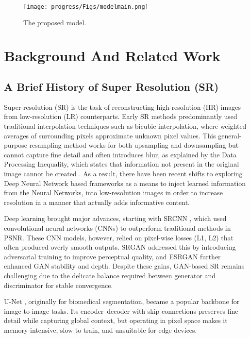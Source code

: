 \documentclass{article} %
\begin{document}
\begin{figure}[h!]
\begin{center}
\texttt{[image: progress/Figs/modelmain.png]}
\end{center}
\caption{The proposed model.}
\label{modelmain}
\end{figure}

\section{Background And Related Work}

\subsection{A Brief History of Super Resolution (SR)}

Super-resolution (SR) is the task of reconstructing high-resolution (HR) images from low-resolution (LR) counterparts. Early SR methods predominantly used traditional interpolation techniques such as bicubic interpolation, where weighted averages of surrounding pixels approximate unknown pixel values. This general-purpose resampling method works for both upsampling and downsampling but cannot capture fine detail and often introduces blur, as explained by the Data Processing Inequality, which states that information not present in the original image cannot be created \citep{cover2012elements}. As a result, there have been recent shifts to exploring Deep Neural Network based frameworks as a means to inject learned information from the Neural Networks, into low-resolution images in order to increase resolution in a manner that actually adds informative content.

Deep learning brought major advances, starting with SRCNN \citep{dong2015cnn}, which used convolutional neural networks (CNNs) to outperform traditional methods in PSNR. These CNN models, however, relied on pixel-wise losses (L1, L2) that often produced overly smooth outputs. SRGAN \citep{ledig2017gan} addressed this by introducing adversarial training to improve perceptual quality, and ESRGAN \citep{wang2018esrgan} further enhanced GAN stability and depth. Despite these gains, GAN-based SR remains challenging due to the delicate balance required between generator and discriminator for stable convergence.

U-Net \citep{ronneberger2015unet}, originally for biomedical segmentation, became a popular backbone for image-to-image tasks. Its encoder–decoder with skip connections preserves fine detail while capturing global context, but operating in pixel space makes it memory-intensive, slow to train, and unsuitable for edge devices.
\end{document}
